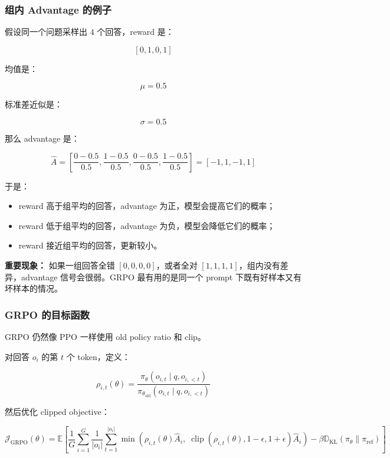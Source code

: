 \subsubsection{组内 Advantage 的例子}

假设同一个问题采样出 $4$ 个回答，reward 是：

\[
[0, 1, 0, 1]
\]

均值是：

\[
\mu = 0.5
\]

标准差近似是：

\[
\sigma = 0.5
\]

那么 advantage 是：

\[
\hat{A}
=
\left[
\frac{0-0.5}{0.5},
\frac{1-0.5}{0.5},
\frac{0-0.5}{0.5},
\frac{1-0.5}{0.5}
\right]
=
[-1, 1, -1, 1]
\]

于是：

\begin{itemize}[leftmargin=1.5em]
  \item reward 高于组平均的回答，advantage 为正，模型会提高它们的概率；
  \item reward 低于组平均的回答，advantage 为负，模型会降低它们的概率；
  \item reward 接近组平均的回答，更新较小。
\end{itemize}

\begin{warnbox}
\textbf{重要现象：} 如果一组回答全错 $[0,0,0,0]$，或者全对 $[1,1,1,1]$，组内没有差异，advantage 信号会很弱。GRPO 最有用的是同一个 prompt 下既有好样本又有坏样本的情况。
\end{warnbox}

\subsubsection{GRPO 的目标函数}

GRPO 仍然像 PPO 一样使用 old policy ratio 和 clip。

对回答 $o_i$ 的第 $t$ 个 token，定义：

\[
\rho_{i,t}(\theta)
=
\frac{
\pi_\theta(o_{i,t} \mid q, o_{i,<t})
}{
\pi_{\theta_\text{old}}(o_{i,t} \mid q, o_{i,<t})
}
\]

然后优化 clipped objective：

\[
\mathcal{J}_\text{GRPO}(\theta)
=
\mathbb{E}
\left[
\frac{1}{G}
\sum_{i=1}^{G}
\frac{1}{|o_i|}
\sum_{t=1}^{|o_i|}
\min
\left(
\rho_{i,t}(\theta)\hat{A}_i,\;
\operatorname{clip}(\rho_{i,t}(\theta),1-\epsilon,1+\epsilon)\hat{A}_i
\right)
-
\beta
\mathbb{D}_\text{KL}
\left(
\pi_\theta
\|
\pi_\text{ref}
\right)
\right]
\]

